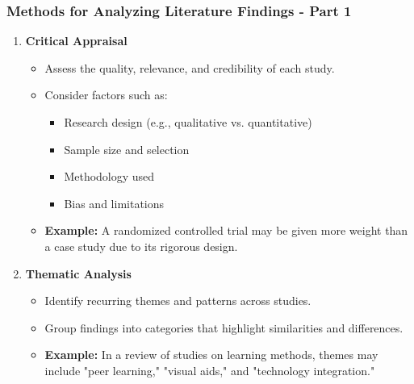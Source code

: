 \documentclass[aspectratio=169]{beamer}
\begin{document}
\begin{frame}[fragile]
    \frametitle{Methods for Analyzing Literature Findings - Part 1}
    \begin{enumerate}
        \item \textbf{Critical Appraisal}
            \begin{itemize}
                \item Assess the quality, relevance, and credibility of each study.
                \item Consider factors such as:
                    \begin{itemize}
                        \item Research design (e.g., qualitative vs. quantitative)
                        \item Sample size and selection
                        \item Methodology used
                        \item Bias and limitations
                    \end{itemize}
                \item \textbf{Example:} A randomized controlled trial may be given more weight than a case study due to its rigorous design.
            \end{itemize}
        
        \item \textbf{Thematic Analysis}
            \begin{itemize}
                \item Identify recurring themes and patterns across studies.
                \item Group findings into categories that highlight similarities and differences.
                \item \textbf{Example:} In a review of studies on learning methods, themes may include "peer learning," "visual aids," and "technology integration."
            \end{itemize}
    \end{enumerate}
\end{frame}
\end{document}
